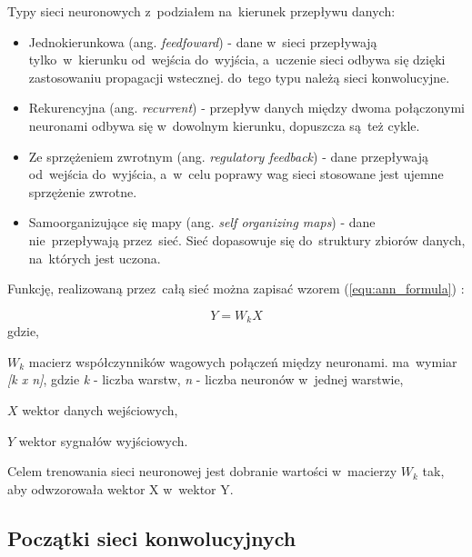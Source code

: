 {\parindent0pt %
Typy sieci neuronowych z~podziałem na~kierunek przepływu danych:
\begin{itemize}
\item{Jednokierunkowa (ang. \textit{feedfoward}) - dane w~sieci przepływają tylko~w~kierunku od~wejścia do~wyjścia, a~uczenie sieci odbywa się dzięki zastosowaniu propagacji wstecznej. do~tego typu należą sieci konwolucyjne.}
\item{Rekurencyjna (ang. \textit{recurrent}) - przepływ danych między dwoma połączonymi neuronami odbywa się w~dowolnym kierunku, dopuszcza są~też cykle.}
\item{Ze sprzężeniem zwrotnym (ang. \textit{regulatory feedback}) - dane przepływają od~wejścia do~wyjścia, a~w~celu poprawy wag sieci stosowane jest ujemne sprzężenie zwrotne.}
\item{Samoorganizujące się mapy (ang. \textit{self organizing maps}) - dane nie~przepływają przez~sieć. Sieć dopasowuje się do~struktury zbiorów danych, na~których jest uczona.}
\end{itemize}

Funkcję, realizowaną przez~całą sieć można zapisać wzorem (\ref{equ:ann_formula}) \cite{tadeusiewicz_sn}:

\begin{equation}
Y = W_k X
\label{equ:ann_formula}
\end{equation}
gdzie,
\begin{eqwhere}[2cm]
	\item[$W_k$] macierz współczynników wagowych połączeń między neuronami. ma~wymiar \textit{[k x n]}, gdzie \textit{k} - liczba warstw, \textit{n} - liczba neuronów w~jednej warstwie,
	\item[$X$] wektor danych wejściowych,
	\item[$Y$] wektor sygnałów wyjściowych.
\end{eqwhere}

Celem trenowania sieci neuronowej jest dobranie wartości w~macierzy \textit{$W_k$} tak, aby odwzorowała wektor X w~wektor Y. 
}
\subsection{Początki sieci konwolucyjnych}

